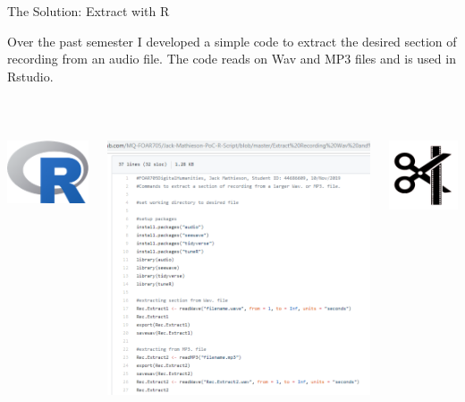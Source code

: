 \documentclass{beamer}
\begin{document}
\begin{frame}{The Solution: Extract with R}

Over the past semester I developed a simple code to extract the desired section of recording from an audio file. The code reads on Wav and MP3 files and is used in Rstudio.

\
\begin{columns}
\begin{column}
\centering
\includegraphics[scale=0.3]{Pictures/Rlogo.png}
\end{column}
\begin{column}
\centering
\includegraphics[scale=0.3]{Pictures/Code.png}
\end{column}
\begin{column}
\centering
\includegraphics[scale=0.5]{Pictures/Cutting.png}
\end{column}
\end{columns}

\end{frame}
\end{document}
